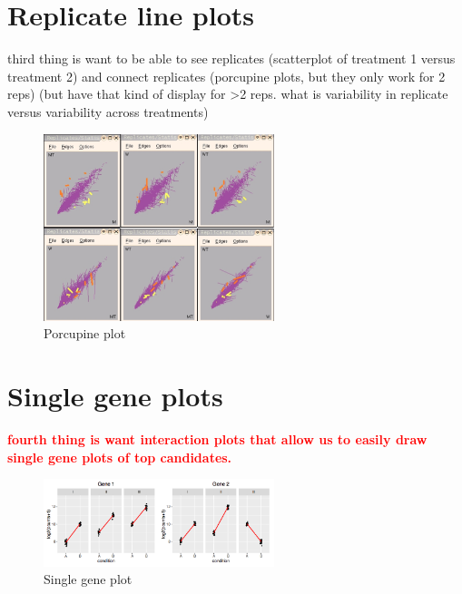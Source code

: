 \documentclass[11pt,a4paper,oldfontcommands,openany]{memoir}
\numberwithin{equation}{section} %
\begin{document}
\section{Replicate line plots}

third thing is want to be able to see replicates (scatterplot of treatment 1 versus treatment 2) and connect replicates (porcupine plots, but they only work for 2 reps) (but have that kind of display for >2 reps. what is variability in replicate versus variability across treatments)

\begin{figure}[H]
    \begin{framed}
    \centering
    \includegraphics[width=0.6\textwidth]{porcupine}
    \end{framed}
    \caption{Porcupine plot}
    \label{fig:porcupine}
\end{figure}

\section{Single gene plots}

\textbf{\textcolor{Red}{fourth thing is want interaction plots that allow us to easily draw single gene plots of top candidates.}}

\begin{figure}[H]
    \begin{framed}
    \centering
    \includegraphics[width=0.6\textwidth]{DESeqGene}
    \end{framed}
    \caption{Single gene plot}
    \label{fig:DESeqGene}
\end{figure}
\end{document}
